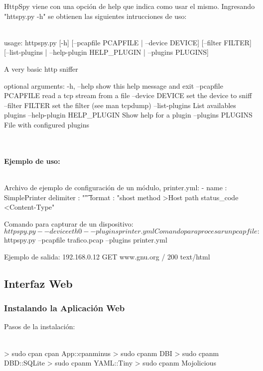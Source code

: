 HttpSpy viene con una opción de help que indica como usar el mismo. Ingresando "httspy.py -h" se obtienen las siguientes intrucciones de uso:
\\\\
	{\small
	\begin{boxedverbatim}
	usage: httpspy.py [-h] [--pcapfile PCAPFILE | --device DEVICE] 
	[--filter FILTER]
	[--list-plugins | --help-plugin HELP_PLUGIN | --plugins PLUGINS]

A very basic http sniffer

optional arguments:
  -h, --help            show this help message and exit
  --pcapfile PCAPFILE   read a tcp stream from a file
  --device DEVICE       set the device to sniff
  --filter FILTER       set the filter (see man tcpdump)
  --list-plugins        List availables plugins
  --help-plugin HELP_PLUGIN
                        Show help for a plugin
  --plugins PLUGINS     File with configured plugins
	\end{boxedverbatim}
	}
\\\\
\textbf{Ejemplo de uso:}
\\\\
{\small
\begin{boxedverbatim}
Archivo de ejemplo de configuración de un módulo, printer.yml:
	- name      : SimplePrinter
	  delimiter : "\t"
	  format    : "shost method >Host path status_code <Content-Type"

Comando para capturar de un dispositivo:
	$httpspy.py --device eth0 --plugins printer.yml

Comando para procesar un pcapfile:
	$httpspy.py --pcapfile trafico.pcap --plugins printer.yml

Ejemplo de salida:
	192.168.0.12	GET	www.gnu.org	/	200	text/html
\end{boxedverbatim}
}

\subsection{Interfaz Web}

\subsubsection{Instalando la Aplicación Web}

Pasos de la instalación:
\\\\
{\small
\begin{boxedverbatim}
	> sudo cpan cpan App::cpanminus
	> sudo cpanm DBI
	> sudo cpanm DBD::SQLite
	> sudo cpanm YAML::Tiny
	> sudo cpanm Mojolicious
\end{boxedverbatim}
}


